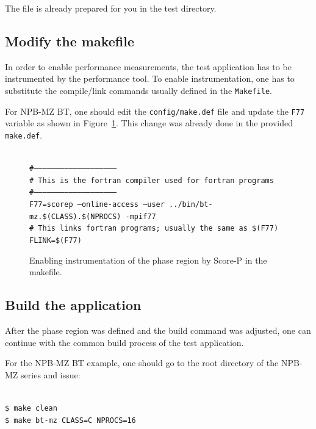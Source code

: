 \documentclass[11pt,oneside,a4paper]{book}
\newenvironment{code}%
{
\addtolength{\leftskip}{0.5cm}}%
{

}
\begin{document}
The file is already prepared for you in the test directory.
	
\subsection{Modify the makefile}

In order to enable performance measurements, the test application has to be instrumented by the performance tool. To enable instrumentation, one has to substitute the compile/link commands usually defined in the \texttt{Makefile}.

For NPB-MZ BT, one should edit the \texttt{config/make.def} file and update the \texttt{F77} variable as shown in Figure~\ref{fig:makefile}. This change was already done in the provided \texttt{make.def}.

\begin{figure}
\begin{code}
\texttt{\\
\#--------------------------------------------------------\\
\# This is the fortran compiler used for fortran programs\\
\#--------------------------------------------------------\\
F77=scorep --online-access --user ../bin/bt-mz.\$(CLASS).\$(NPROCS) -mpif77 \\
\# This links fortran programs; usually the same as \$(F77)\\
FLINK=\$(F77)\\
}
\end{code}
\caption{Enabling instrumentation of the phase region by Score-P in the makefile.}
\label{fig:makefile}
\end{figure}


\subsection{Build the application}

After the phase region was defined and the build command was adjusted, one can continue with the common build process of the test application.

For the NPB-MZ BT example, one should go to the root directory of the NPB-MZ series and issue:

\begin{code}
	\texttt{\\
	\$ make clean\\
	\$ make bt-mz CLASS=C NPROCS=16}
\end{code}
\end{document}
